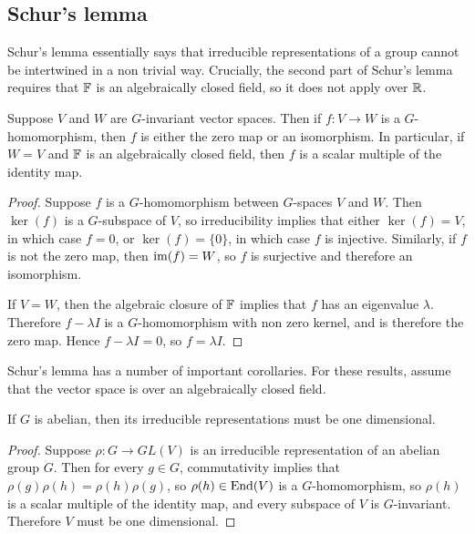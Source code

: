 \documentclass[a4paper]{article}
\begin{document}
\subsection{Schur's lemma} 

Schur's lemma essentially says that irreducible representations of a group cannot be intertwined in a non trivial way. Crucially, the second part of Schur's lemma requires that $\mathbb{F}$ is an algebraically closed field, so it does not apply over $\mathbb{R}$.

\begin{lemma}
    Suppose $V$ and $W$ are $G$-invariant vector spaces. Then if $f:V \to W$ is a $G$-homomorphism, then $f$ is either the zero map or an isomorphism. In particular, if $W = V$ and $\mathbb{F}$ is an algebraically closed field, then $f$ is a scalar multiple of the identity map.
\end{lemma}

\begin{proof}
    Suppose $f$ is a $G$-homomorphism between $G$-spaces $V$ and $W$. Then $\ker(f)$ is a $G$-subspace of $V$, so irreducibility implies that either $\ker(f) = V$, in which case $f = 0$, or $\ker(f) = \{0\}$, in which case $f$ is injective. Similarly, if $f$ is not the zero map, then $\operatorname{im}(f)= W$, so $f$ is surjective and therefore an isomorphism. 

    If $V = W$, then the algebraic closure of $\mathbb{F}$ implies that $f$ has an eigenvalue $\lambda$. Therefore $f - \lambda I$ is a $G$-homomorphism with non zero kernel, and is therefore the zero map. Hence $f - \lambda I = 0$, so $f = \lambda I$.
\end{proof}

Schur's lemma has a number of important corollaries. For these results, assume that the vector space is over an algebraically closed field.

\begin{cor}
    If $G$ is abelian, then its irreducible representations must be one dimensional.
\end{cor}

\begin{proof}
    Suppose $\rho:G \to GL(V)$ is an irreducible representation of an abelian group $G$. Then for every $g \in G$, commutativity implies that $\rho(g)\rho(h) = \rho(h)\rho(g)$, so $\rho(h) \in \operatorname{End}(V)$ is a $G$-homomorphism, so $\rho(h)$ is a scalar multiple of the identity map, and every subspace of $V$ is $G$-invariant. Therefore $V$ must be one dimensional.
\end{proof}
\end{document}
